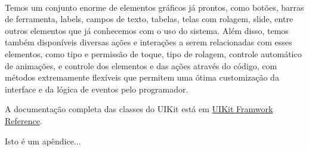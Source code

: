 \documentclass[a4paper,12pt,brazil,doubleside]{book}
\begin{document}
\paragraph{}Temos um conjunto enorme de elementos gráficos já prontos, como botões, barras de ferramenta, labels, campos de texto, tabelas, telas com rolagem, slide, entre outros elementos que já conhecemos com o uso do sistema. Além disso, temos também disponíveis diversas ações e interações a serem relacionadas com esses elementos, como tipo e permissão de toque, tipo de rolagem, controle automático de animações, e controle dos elementos e das ações através do código, com métodos extremamente flexíveis que permitem uma ótima customização da interface e da lógica de eventos pelo programador.

A documentação completa das classes do UIKit está em 
\href{http://developer.apple.com/library/ios/#documentation/uikit/reference/UIKit_Framework/_index.html}{UIKit Framwork Reference}.



\thispagestyle{empty}

\doublespace

\cleardoublepage

\pagestyle{body}


\begin{singlespace}



\end{singlespace}



\singlespace
{}
\cleardoublepage
\thispagestyle{empty}
{}


\doublespace


\appendix
{} %

Isto é um apêndice...

\end{document}
